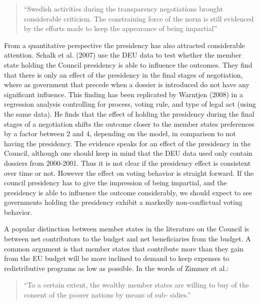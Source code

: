 \begin{quote}
``Swedish activities during the transparency negotiations brought considerable criticism. The constraining force of the norm is still evidenced by the efforts made to keep the appearance of being impartial''
\end{quote}

From a quantitative perspective the presidency has also attracted considerable attention. Schalk et al. (2007) use the DEU data to test whether the member state holding the Council presidency is able to influence the outcomes. They find that there is only an effect of the presidency in the final stages of negotiation, where as government that precede when a dossier is introduced do not have any significant influence. This finding has been replicated by Warntjen (2008) in a regression analysis controlling for process, voting rule, and type of legal act (using the same data). He finds that the effect of holding the presidency during the final stages of a negotiation shifts the outcome closer to the member states preferences by a factor between 2 and 4, depending on the model, in comparison to not having the presidency.
The evidence speaks for an effect of the presidency in the Council, although one should keep in mind that the DEU data used only contain dossiers from 2000-2001. Thus it is not clear if the presidency effect is consistent over time or not. However the effect on voting behavior is straight forward. If the council presidency has to give the impression of being impartial, and the presidency is able to influence the outcome considerably, we should expect to see governments holding the presidency exhibit a markedly non-conflictual voting behavior. 

A popular distinction between member states in the literature on the Council is between net contributors to the budget and net beneficiaries from the budget. A common argument is that member states that contribute more than they gain from the EU budget will be more inclined to demand to keep expenses to redistributive programs as low as possible. In the words of Zimmer et al.:

\begin{quote}
``To a certain extent, the wealthy member states are willing to buy of the consent of the poorer nations by means of sub- sidies.''
\end{quote}


